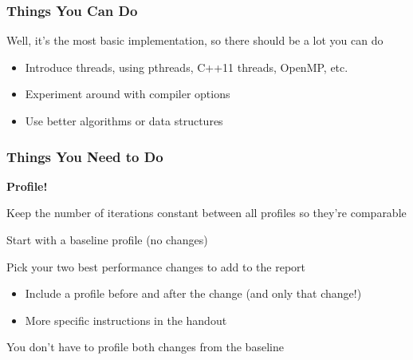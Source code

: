 \documentclass[aspectratio=169,10pt,compress]{beamer}
\begin{document}
\begin{frame}
  \frametitle{Things You Can Do}

  Well, it's the most basic implementation, so there should be a lot you can do

  \begin{itemize}
    \item Introduce threads, using pthreads, C++11 threads, OpenMP, etc.

    \vspace{1em}
   
    \item Experiment around with compiler options

    \vspace{1em}

    \item Use better algorithms or data structures
  \end{itemize}
\end{frame}


\begin{frame}
  \frametitle{Things You Need to Do}

  {\bfseries Profile!}

  \vspace{1em}

  Keep the number of iterations constant between all profiles so they're
  comparable

  \vspace{1em}
    
  Start with a baseline profile (no changes)

  \vspace{1em}

  Pick your two best performance changes to add to the report
  \begin{itemize}
    \item Include a profile before and after the change (and only that
      change!)
    \item More specific instructions in the handout
  \end{itemize}

  \vspace{1em}

  You don't have to profile both changes from the baseline
\end{frame}
\end{document}
